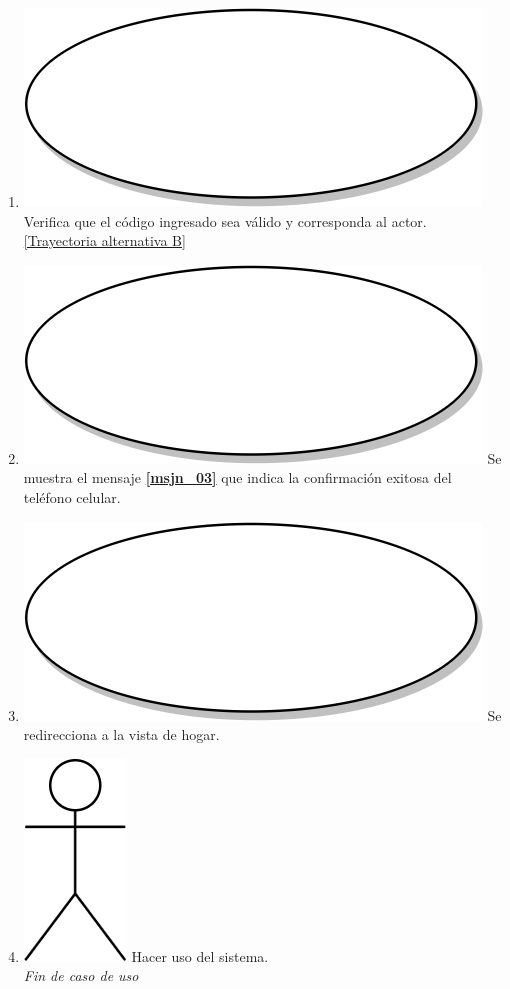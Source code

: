 \begin{enumerate}
  \item {\includegraphics[scale=.05]{Capitulo3/img/proceso.png} Verifica que el código ingresado sea válido y corresponda al actor. \hyperref[cu2_1_ta_b]{[Trayectoria alternativa B]}}
  \item {\includegraphics[scale=.05]{Capitulo3/img/proceso.png} Se muestra el mensaje \textbf{\ref{msjn_03}} que indica la confirmación exitosa del teléfono celular.}
  \item {\includegraphics[scale=.05]{Capitulo3/img/proceso.png} Se redirecciona a la vista de hogar.}
    \item {\includegraphics[scale=.1]{Capitulo3/img/actor.png} Hacer uso del sistema.} \\
  \textit{Fin de caso de uso} \\	
\end{enumerate}

